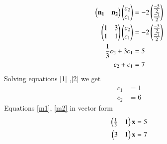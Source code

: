 \documentclass[journal,12pt,twocolumn]{IEEEtran}
\begin{document}
\begin{align}
    \begin{pmatrix}\mathbf{n_1} & \mathbf{n_2}\end{pmatrix}\begin{pmatrix}c_2\\c_1\end{pmatrix}&=-2\begin{pmatrix}\frac{-5}{2}\\\frac{-7}{2}\end{pmatrix}\\
    \begin{pmatrix}1& 3\\1 & 1\end{pmatrix}\begin{pmatrix}c_2\\c_1\end{pmatrix}&=-2\begin{pmatrix}\frac{-5}{2}\\\frac{-7}{2}\end{pmatrix}\\
    \frac{1}{3}c_2+3c_1&=5\label{1}\\
    c_2+c_1&=7\label{2}
\end{align}
Solving equations \eqref{1} ,\eqref{2} we get 
\begin{align}
    c_1&=1\\
    c_2&=6
\end{align}
Equations \eqref{m1}, \eqref{m2} in vector form
\begin{align}
    \begin{pmatrix}\frac{1}{3}& 1\end{pmatrix}\mathbf{x}&=5\\
    \begin{pmatrix}3 & 1\end{pmatrix}\mathbf{x}&=7
\end{align}
\end{document}
